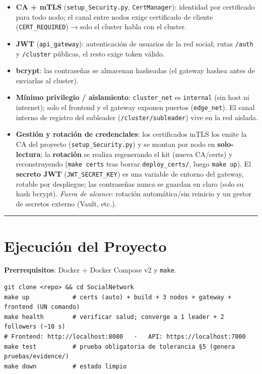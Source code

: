\documentclass[11pt]{article}
\begin{document}
\begin{itemize}
\item \textbf{CA + mTLS} (\texttt{setup\_\allowbreak{}Security.\allowbreak{}py}, \texttt{CertManager}): identidad por certificado para todo nodo; el canal entre nodos exige certificado de cliente (\texttt{CERT\_\allowbreak{}REQUIRED}) → solo el cluster habla con el cluster.
\item \textbf{JWT} (\texttt{api\_\allowbreak{}gateway}): autenticación de usuarios de la red social; rutas \texttt{/\allowbreak{}auth} y \texttt{/\allowbreak{}cluster} públicas, el resto exige token válido.
\item \textbf{bcrypt}: las contraseñas se almacenan hasheadas (el gateway hashea antes de enviarlas al cluster).
\item \textbf{Mínimo privilegio / aislamiento}: \texttt{cluster\_\allowbreak{}net} es \texttt{internal} (sin host ni internet); solo el frontend y el gateway exponen puertos (\texttt{edge\_\allowbreak{}net}). El canal interno de registro del subleader (\texttt{/\allowbreak{}cluster/\allowbreak{}subleader}) vive en la red aislada.
\item \textbf{Gestión y rotación de credenciales}: los certificados mTLS los emite la CA del proyecto (\texttt{setup\_\allowbreak{}Security.\allowbreak{}py}) y se montan por nodo en \textbf{solo-lectura}; la \textbf{rotación} se realiza regenerando el kit (nueva CA/certs) y reconstruyendo (\texttt{make certs} tras borrar \texttt{deploy\_\allowbreak{}certs/\allowbreak{}}, luego \texttt{make up}). El \textbf{secreto JWT} (\texttt{JWT\_\allowbreak{}SECRET\_\allowbreak{}KEY}) es una variable de entorno del gateway, rotable por despliegue; las contraseñas nunca se guardan en claro (solo su hash bcrypt). \emph{Fuera de alcance}: rotación automática/sin reinicio y un gestor de secretos externo (Vault, etc.).
\end{itemize}

\vspace{2pt}\noindent\rule{\textwidth}{0.4pt}\vspace{2pt}

\section{Ejecución del Proyecto}

\textbf{Prerrequisitos}: Docker + Docker Compose v2 y \texttt{make}.

\begin{lstlisting}
git clone <repo> && cd SocialNetwork
make up            # certs (auto) + build + 3 nodos + gateway + frontend (UN comando)
make health        # verificar salud; converge a 1 leader + 2 followers (~10 s)
# Frontend: http://localhost:8080   ·   API: https://localhost:7000
make test          # prueba obligatoria de tolerancia §5 (genera pruebas/evidence/)
make down          # estado limpio
\end{lstlisting}
\end{document}
